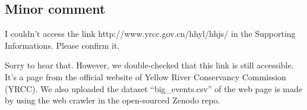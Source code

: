 \subsection*{Minor comment}

\RC{} I couldn't access the link http://www.yrcc.gov.cn/hhyl/hhjs/ in the Supporting Informations. Please confirm it.

\AR{} Sorry to hear that. However, we double-checked that this link is still accessible. It's a page from the official website of Yellow River Conservancy Commission (YRCC). We also uploaded the dataset ``big\_events.csv'' of the web page is made by using the web crawler in the open-sourced Zenodo repo.
